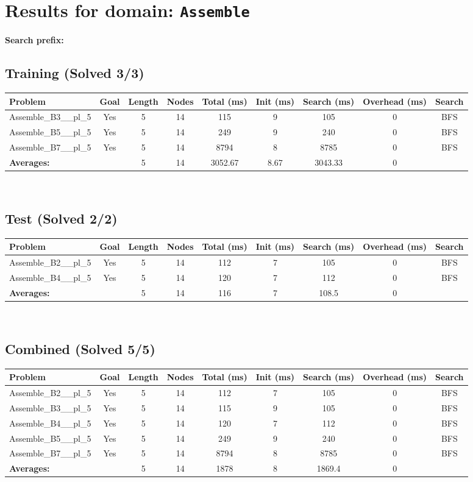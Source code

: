 \documentclass{article}
\begin{document}
\section*{Results for domain: \texttt{Assemble}}
\textbf{Search prefix:} 
\\[0.5cm]
\subsection*{Training (Solved 3/3)}
\begin{tabular}{lcccccccc}
\toprule
Problem & Goal & Length & Nodes & Total (ms) & Init (ms) & Search (ms) & Overhead (ms) & Search \\
\midrule
Assemble\_B3\_\_pl\_5 & Yes & 5 & 14 & 115 & 9 & 105 & 0 & BFS \\
Assemble\_B5\_\_pl\_5 & Yes & 5 & 14 & 249 & 9 & 240 & 0 & BFS \\
Assemble\_B7\_\_pl\_5 & Yes & 5 & 14 & 8794 & 8 & 8785 & 0 & BFS \\
\textbf{Averages:} & & 5 & 14 & 3052.67 & 8.67 & 3043.33 & 0 & \\
\bottomrule
\end{tabular}
\\[0.7cm]
\subsection*{Test (Solved 2/2)}
\begin{tabular}{lcccccccc}
\toprule
Problem & Goal & Length & Nodes & Total (ms) & Init (ms) & Search (ms) & Overhead (ms) & Search \\
\midrule
Assemble\_B2\_\_pl\_5 & Yes & 5 & 14 & 112 & 7 & 105 & 0 & BFS \\
Assemble\_B4\_\_pl\_5 & Yes & 5 & 14 & 120 & 7 & 112 & 0 & BFS \\
\textbf{Averages:} & & 5 & 14 & 116 & 7 & 108.5 & 0 & \\
\bottomrule
\end{tabular}
\\[0.7cm]
\subsection*{Combined (Solved 5/5)}
\begin{tabular}{lcccccccc}
\toprule
Problem & Goal & Length & Nodes & Total (ms) & Init (ms) & Search (ms) & Overhead (ms) & Search \\
\midrule
Assemble\_B2\_\_pl\_5 & Yes & 5 & 14 & 112 & 7 & 105 & 0 & BFS \\
Assemble\_B3\_\_pl\_5 & Yes & 5 & 14 & 115 & 9 & 105 & 0 & BFS \\
Assemble\_B4\_\_pl\_5 & Yes & 5 & 14 & 120 & 7 & 112 & 0 & BFS \\
Assemble\_B5\_\_pl\_5 & Yes & 5 & 14 & 249 & 9 & 240 & 0 & BFS \\
Assemble\_B7\_\_pl\_5 & Yes & 5 & 14 & 8794 & 8 & 8785 & 0 & BFS \\
\textbf{Averages:} & & 5 & 14 & 1878 & 8 & 1869.4 & 0 & \\
\bottomrule
\end{tabular}
\\[0.7cm]
\end{document}
